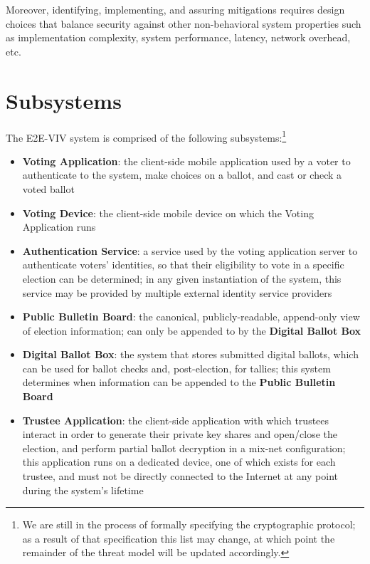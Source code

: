 \documentclass[10pt,letterpaper]{article}
\begin{document}
Moreover, identifying, implementing, and assuring mitigations requires design choices that balance security against other non-behavioral system properties such as implementation complexity, system performance, latency, network overhead, etc.

\pagebreak
\section{Subsystems}

The E2E-VIV system is comprised of the following subsystems:\footnote{We are still in the process of formally specifying the cryptographic protocol; as a result of that specification this list may change, at which point the remainder of the threat model will be updated accordingly.}

\begin{itemize}

    \item \textbf{Voting Application}: the client-side mobile application used by a voter to authenticate to the system, make choices on a ballot, and cast or check a voted ballot

    \item \textbf{Voting Device}: the client-side mobile device on which the Voting Application runs

    \item \textbf{Authentication Service}: a service used by the voting application server to authenticate voters' identities, so that their eligibility to vote in a specific election can be determined; in any given instantiation of the system, this service may be provided by multiple external identity service providers

    \item \textbf{Public Bulletin Board}: the canonical, publicly-readable, append-only view of election information; can only be appended to by the \textbf{Digital Ballot Box}

    \item \textbf{Digital Ballot Box}: the system that stores submitted digital ballots, which can be used for ballot checks and, post-election, for tallies; this system determines when information can be appended to the \textbf{Public Bulletin Board}

    \item \textbf{Trustee Application}: the client-side application with which trustees interact in order to generate their private key shares and open/close the election, and perform partial ballot decryption in a mix-net configuration; this application runs on a dedicated device, one of which exists for each trustee, and must not be directly connected to the Internet at any point during the system's lifetime


\end{itemize}
\end{document}
